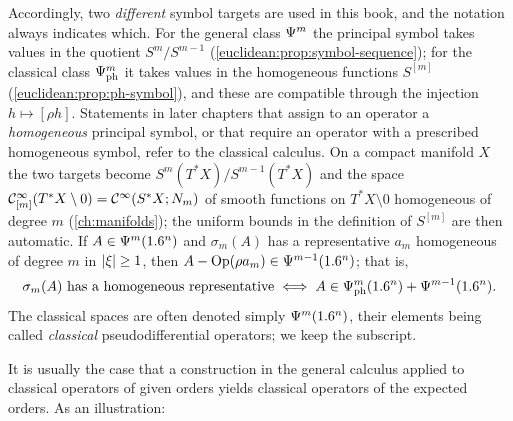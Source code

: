 Accordingly, two \emph{different} symbol targets are used in this book, and the
notation always indicates which. For the general class $\Psi^{m}$ the principal
symbol takes values in the quotient $S^m/S^{m-1}$
(\cref{euclidean:prop:symbol-sequence}); for the classical class
$\Psi^{m}_{\mathrm{ph}}$ it takes values in the homogeneous functions $S^{[m]}$
(\cref{euclidean:prop:ph-symbol}), and these are compatible through the injection
$h\mapsto[\rho h]$. Statements in later chapters that assign to an operator a
\emph{homogeneous} principal symbol, or that require an operator with a prescribed
homogeneous symbol, refer to the classical calculus. On a compact manifold $X$
the two targets become $S^{m}(T^*X)/S^{m-1}(T^*X)$ and the space
$\mathcal{C}^\infty_{[m]}(T^*X\setminus0)=\mathcal{C}^\infty(S^*X;N_m)$ of smooth functions on $T^*X\setminus0$
homogeneous of degree $m$ (\cref{ch:manifolds}); the uniform bounds in the
definition of $S^{[m]}$ are then automatic. If
$A\in\Psi^{m}(1.6^n)$ and $\sigma_m(A)$ has a representative $a_m$ homogeneous of
degree $m$ in $\lvert \xi\rvert\ge1$, then $A-\operatorname{Op}(\rho a_m)\in\Psi^{m-1}(1.6^n)$; that is,
\begin{equation*}
  \sigma_m(A)\text{ has a homogeneous representative}\iff
  A\in\Psi^{m}_{\mathrm{ph}}(1.6^n)+\Psi^{m-1}(1.6^n).
\end{equation*}
The classical spaces are often denoted simply $\Psi^{m}(1.6^n)$, their elements being
called \emph{classical} pseudodifferential operators; we keep the subscript.

It is usually the case that a construction in the general calculus applied
to classical operators of given orders yields classical operators of the
expected orders. As an illustration:

